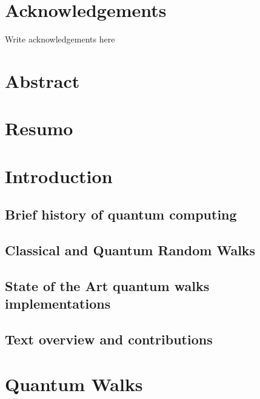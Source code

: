 \documentclass[
oneside,
11pt, a4paper,
footinclude=true,
headinclude=true,
cleardoublepage=empty
]{scrbook}
\author{Jaime Santos}
\date{\myear} %
\begin{document}
\umfrontcover	
\umtitlepage

\chapter*{Acknowledgements}
Write acknowledgements here


\chapter*{Abstract}


\cleardoublepage
\chapter*{Resumo}


\tableofcontents
\listoffigures
\listoftables



\chapter{Introduction}\label{chap:introduction}
\section{Brief history of quantum computing}

\section{Classical and Quantum Random Walks}

\section{State of the Art quantum walks implementations}

\section{Text overview and contributions}


\chapter{Quantum Walks}\label{chap:QuantumWalks}

\end{document}
